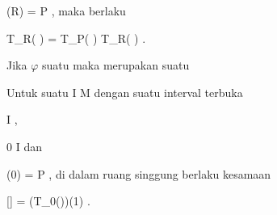 {{{\mavergleichskette
{\vergleichskette
{ \psi(R)
}
{ = }{ P
}
{  }{
}
{    }{
}
{   }{
}
}
{}{}{}
,
maka berlaku

\mavergleichskettedisp
{\vergleichskette
{ T_R( \varphi \circ \psi)
}
{ =} { T_P( \varphi) \circ T_R( \psi)
}
{ } {
}
{ } {
}
{ } {
}
}
{}{}{.}
}{Jika $\varphi$ suatu
maka
merupakan suatu
}{Untuk suatu
\maabbdisp {\gamma} { I } { M
} {}
dengan suatu interval terbuka

\mavergleichskette
{\vergleichskette
{I
}
{ \subseteq }{\R
}
{  }{
}
{    }{
}
{   }{
}
}
{}{}{,}

\mavergleichskette
{\vergleichskette
{ 0
}
{ \in }{ I
}
{  }{
}
{    }{
}
{   }{
}
}
{}{}{}
dan

\mavergleichskette
{\vergleichskette
{ \gamma(0)
}
{ = }{ P
}
{  }{
}
{    }{
}
{   }{
}
}
{}{}{}
,
di dalam ruang singgung
berlaku kesamaan

\mavergleichskettedisp
{\vergleichskette
{ [\gamma]
}
{ =} { (T_0(\gamma))(1)
}
{ } {
}
{ } {
}
{ } {
}
}
{}{}{.}
}}
\faktzusatz {}
\faktzusatz {}

}
